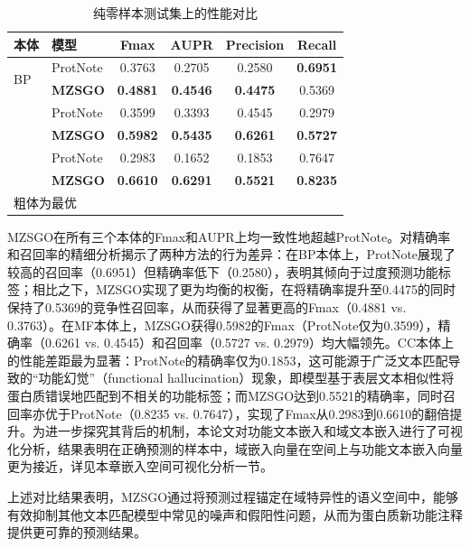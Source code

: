 \begin{table}[htbp]
\centering
\caption{纯零样本测试集上的性能对比}
\label{tab:mzsgo_zeroshot}
\small
\begin{tabular}{llcccc}
\toprule
\textbf{本体} & \textbf{模型} & \textbf{Fmax} & \textbf{AUPR} & \textbf{Precision} & \textbf{Recall} \\
\midrule
\multirow{2}{*}{BP} 
 & ProtNote & 0.3763 & 0.2705 & 0.2580 & \textbf{0.6951} \\
 & \textbf{MZSGO} & \textbf{0.4881} & \textbf{0.4546} & \textbf{0.4475} & 0.5369 \\
\addlinespace[5pt]
\multirow{2}{*}{MF} 
 & ProtNote & 0.3599 & 0.3393 & 0.4545 & 0.2979 \\
 & \textbf{MZSGO} & \textbf{0.5982} & \textbf{0.5435} & \textbf{0.6261} & \textbf{0.5727} \\
\addlinespace[5pt]
\multirow{2}{*}{CC} 
 & ProtNote & 0.2983 & 0.1652 & 0.1853 & 0.7647 \\
 & \textbf{MZSGO} & \textbf{0.6610} & \textbf{0.6291} & \textbf{0.5521} & \textbf{0.8235} \\
\bottomrule
\multicolumn{6}{l}{\vspace{0.2em}\footnotesize 粗体为最优} \\
\end{tabular}
\end{table}

MZSGO在所有三个本体的Fmax和AUPR上均一致性地超越ProtNote。对精确率和召回率的精细分析揭示了两种方法的行为差异：在BP本体上，ProtNote展现了较高的召回率（0.6951）但精确率低下（0.2580），表明其倾向于过度预测功能标签；相比之下，MZSGO实现了更为均衡的权衡，在将精确率提升至0.4475的同时保持了0.5369的竞争性召回率，从而获得了显著更高的Fmax（0.4881 vs. 0.3763）。在MF本体上，MZSGO获得0.5982的Fmax（ProtNote仅为0.3599），精确率（0.6261 vs. 0.4545）和召回率（0.5727 vs. 0.2979）均大幅领先。CC本体上的性能差距最为显著：ProtNote的精确率仅为0.1853，这可能源于广泛文本匹配导致的“功能幻觉”（functional hallucination）现象，即模型基于表层文本相似性将蛋白质错误地匹配到不相关的功能标签；而MZSGO达到0.5521的精确率，同时召回率亦优于ProtNote（0.8235 vs. 0.7647），实现了Fmax从0.2983到0.6610的翻倍提升。为进一步探究其背后的机制，本论文对功能文本嵌入和域文本嵌入进行了可视化分析，结果表明在正确预测的样本中，域嵌入向量在空间上与功能文本嵌入向量更为接近，详见本章嵌入空间可视化分析一节。

上述对比结果表明，MZSGO通过将预测过程锚定在域特异性的语义空间中，能够有效抑制其他文本匹配模型中常见的噪声和假阳性问题，从而为蛋白质新功能注释提供更可靠的预测结果。

